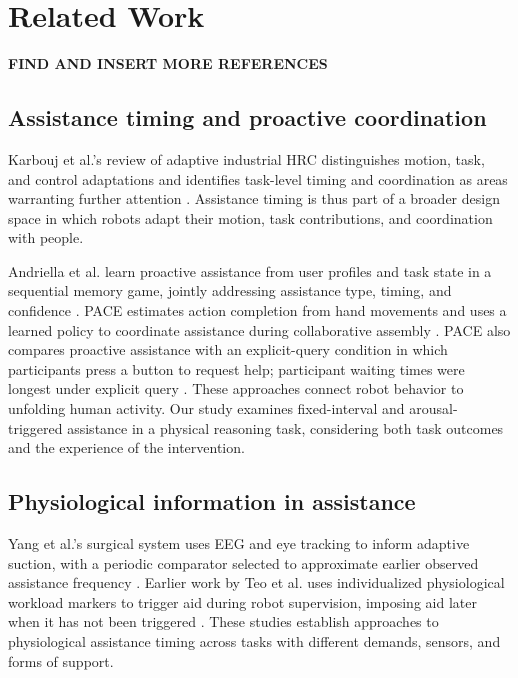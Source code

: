 \documentclass[sigconf,anonymous,balance=false]{aamas}
\providecommand{\DIFadd}[1]{{\protect\color{blue} \sf #1}} %
\providecommand{\DIFaddbegin}{} %
\providecommand{\DIFaddend}{} %
\begin{document}
\section{Related Work}

\textbf{FIND AND INSERT MORE REFERENCES}

\subsection{Assistance timing and proactive coordination}

Karbouj et al.'s review of adaptive industrial HRC distinguishes motion, task, and control adaptations and identifies task-level timing and coordination as areas warranting further attention \cite{karbouj2026}. Assistance timing is thus part of a broader design space in which robots adapt their motion, task contributions, and coordination with people.

Andriella et al. learn proactive assistance from user profiles and task state in a sequential memory game, jointly addressing assistance type, timing, and confidence \cite{andriella2025}. PACE estimates action completion from hand movements and uses a learned policy to coordinate assistance during collaborative assembly \cite{delazzari2025}. \DIFaddbegin \DIFadd{PACE also compares proactive assistance with an explicit-query condition in which participants press a button to request help; participant waiting times were longest under explicit query \cite{delazzari2025}. }\DIFaddend These approaches connect robot behavior to unfolding human activity. Our study examines fixed-interval and arousal-triggered assistance in a physical reasoning task, considering both task outcomes and the experience of the intervention.

\subsection{Physiological information in assistance}

Yang et al.'s surgical system uses EEG and eye tracking to inform adaptive suction, with a periodic comparator selected to approximate earlier observed assistance frequency \cite{yang2024}. Earlier work by Teo et al. uses individualized physiological workload markers to trigger aid during robot supervision, imposing aid later when it has not been triggered \cite{teo2018}. These studies establish approaches to physiological assistance timing across tasks with different demands, sensors, and forms of support.
\end{document}
